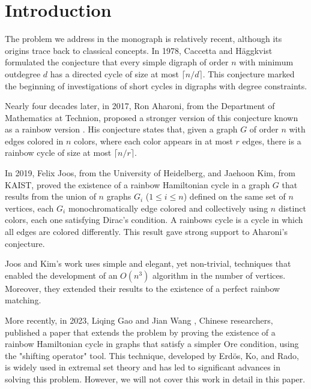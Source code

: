 
\chapter{Introduction}

The problem we address in the monograph is relatively recent, although its origins trace back to classical concepts. 
In 1978, Caccetta and Häggkvist \cite{nathanson2006caccettahaggkvistconjectureadditivenumber} formulated the conjecture 
that every simple digraph of order $n$ with minimum outdegree $d$ 
has a directed cycle of size at most $\lceil n/d \rceil$. This conjecture marked the beginning of investigations 
of short cycles in digraphs with degree constraints.

Nearly four decades later, in 2017, Ron Aharoni, from the Department of Mathematics at Technion, proposed a stronger 
version of this conjecture known as a rainbow version \cite{AharonisConjecture}. His conjecture states that, given a graph $G$ of order $n$ 
with edges colored in $n$ colors, where each color appears in at most $r$ edges, there is a rainbow cycle of size 
at most $\lceil n/r \rceil$.

In 2019, Felix Joos, from the University of Heidelberg, and Jaehoon Kim, from KAIST, 
proved the existence of a rainbow Hamiltonian cycle in a graph $G$ that results from the union of $n$ graphs
$G_i$ ($1 \leq i \leq n$) defined on the same set of $n$ vertices, each $G_i$ monochromatically edge colored
and collectively using $n$ distinct colors, each one satisfying Dirac's condition. A rainbows cycle is a cycle 
in which all edges are colored differently. This result gave strong support to Aharoni's conjecture.

Joos and Kim's work uses simple and elegant, yet non-trivial, techniques that enabled the development of an $O(n^3)$ 
algorithm in the number of vertices. Moreover, they extended their results to the existence of a perfect rainbow 
matching.

More recently, in 2023, Liqing Gao and Jian Wang \cite{gao_wang_2024}, Chinese researchers, published a paper that extends the problem 
by proving the existence of a rainbow Hamiltonian cycle in graphs that satisfy a simpler Ore condition, using the 
"shifting operator" tool. This technique, developed by Erdös, Ko, and Rado, is widely used in extremal set theory 
and has led to significant advances in solving this problem. However, we will not cover this work in detail in 
this paper.

